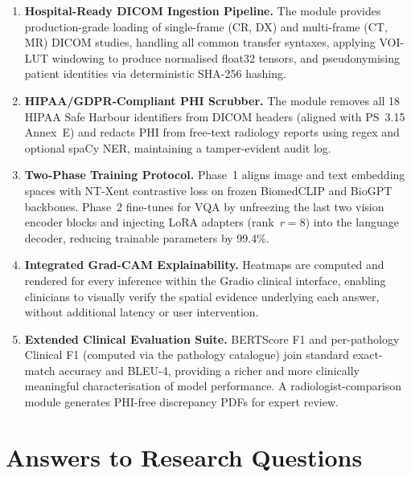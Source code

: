 \begin{enumerate}[label=\textbf{C\arabic*.}]

  \item \textbf{Hospital-Ready DICOM Ingestion Pipeline.}
        The  module provides
        production-grade loading of single-frame (CR, DX) and multi-frame
        (CT, MR) DICOM studies, handling all common transfer syntaxes,
        applying VOI-LUT windowing to produce normalised float32 tensors,
        and pseudonymising patient identities via deterministic SHA-256 hashing.

  \item \textbf{HIPAA/GDPR-Compliant PHI Scrubber.}
        The  module removes all 18 HIPAA Safe Harbour
        identifiers from DICOM headers (aligned with PS~3.15 Annex~E) and
        redacts PHI from free-text radiology reports using regex and
        optional spaCy NER, maintaining a tamper-evident audit log.

  \item \textbf{Two-Phase Training Protocol.}
        Phase~1 aligns image and text embedding spaces with NT-Xent
        contrastive loss on frozen BiomedCLIP and BioGPT backbones.
        Phase~2 fine-tunes for VQA by unfreezing the last two vision encoder
        blocks and injecting LoRA adapters (rank~$r=8$) into the language
        decoder, reducing trainable parameters by 99.4\%.

  \item \textbf{Integrated Grad-CAM Explainability.}
        Heatmaps are computed and rendered for every inference within the
        Gradio clinical interface, enabling clinicians to visually verify
        the spatial evidence underlying each answer, without additional
        latency or user intervention.

  \item \textbf{Extended Clinical Evaluation Suite.}
        BERTScore F1 and per-pathology Clinical F1 (computed via the
         pathology catalogue) join standard exact-match
        accuracy and BLEU-4, providing a richer and more clinically
        meaningful characterisation of model performance. A radiologist-comparison
        module generates PHI-free discrepancy PDFs for expert review.
\end{enumerate}

\section{Answers to Research Questions}
\label{sec:answers}

